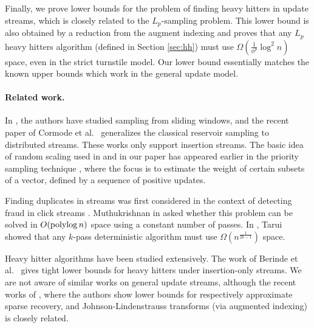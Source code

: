 
Finally, we prove lower bounds for the problem of finding heavy hitters in update streams, 
which is closely related to the $L_p$-sampling problem. This lower bound is also obtained 
by a reduction from the augment indexing and proves that any $L_p$ heavy 
hitters algorithm (defined in Section \ref{sec:hh}) must use 
$\Omega(\frac{1}{\phi^p}\log^2 n)$ space, even in the strict turnstile model. 
Our lower bound essentially matches the known upper bounds \cite{CormodeM05,CharikarCF04,KaneNPW} which work in the general update model. 

\paragraph{Related work.} In \cite{BabcockDM02,BravermanOZ09}, the authors have 
studied sampling from sliding windows, and the recent paper
of Cormode et al.\ \cite{CormodeMYZ10} generalizes the classical reservoir sampling 
to distributed streams. These works only support insertion streams.
 The basic idea of random scaling used in \cite{AndoniKO10} and in our paper has appeared earlier in
 the priority sampling technique \cite{DuffieldLT07,CohenDKLT09}, where the focus is
 to estimate the weight of certain subsets of a vector, defined by a sequence of positive updates.
 
Finding duplicates in streams was first considered 
in the context of detecting fraud in click streams \cite{MetwallyAA05}. 
Muthukrishnan in \cite{Muthukrishnan}
asked whether this problem can be solved in 
$O(\operatorname{polylog} n)$ space using a constant number of passes. In \cite{Tarui}, Tarui showed
that any $k$-pass deterministic algorithm must use $\Omega(n^{\frac1{2k-1}})$
space. 
 
Heavy hitter algorithms have been studied extensively. 
The work of Berinde et al.\
\cite{BerindeCIS09} gives tight lower bounds for heavy hitters under 
 insertion-only streams. We are not aware of similar works on
general update streams, although the recent works of \cite{BaIPW10, WoodruffJ11},
 where the authors show lower bounds for respectively approximate
sparse recovery, and Johnson-Lindenstrauss transforms (via augmented indexing) is closely related.    
    

